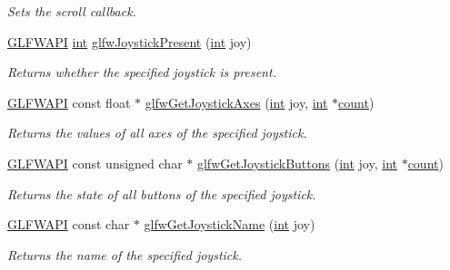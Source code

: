 \begin{DoxyCompactItemize}
\begin{DoxyCompactList}\small\item\em Sets the scroll callback. \end{DoxyCompactList}\item 
\hyperlink{glfw3_8h_a56da5036b2cc259351ae22fd6439bb47}{G\-L\-F\-W\-A\-P\-I} \hyperlink{wglew_8h_a500a82aecba06f4550f6849b8099ca21}{int} \hyperlink{group__input_ga7f81f22f355f4b7d315caf73cdfd9906}{glfw\-Joystick\-Present} (\hyperlink{wglew_8h_a500a82aecba06f4550f6849b8099ca21}{int} joy)
\begin{DoxyCompactList}\small\item\em Returns whether the specified joystick is present. \end{DoxyCompactList}\item 
\hyperlink{glfw3_8h_a56da5036b2cc259351ae22fd6439bb47}{G\-L\-F\-W\-A\-P\-I} const float $\ast$ \hyperlink{group__input_gaab9e573d808b088c5079c0f577d39448}{glfw\-Get\-Joystick\-Axes} (\hyperlink{wglew_8h_a500a82aecba06f4550f6849b8099ca21}{int} joy, \hyperlink{wglew_8h_a500a82aecba06f4550f6849b8099ca21}{int} $\ast$\hyperlink{glew_8h_a10b284d589000663becfbc6867a3a9f7}{count})
\begin{DoxyCompactList}\small\item\em Returns the values of all axes of the specified joystick. \end{DoxyCompactList}\item 
\hyperlink{glfw3_8h_a56da5036b2cc259351ae22fd6439bb47}{G\-L\-F\-W\-A\-P\-I} const unsigned char $\ast$ \hyperlink{group__input_ga3951bea72b5fb4870b1aa0e5c2e9c903}{glfw\-Get\-Joystick\-Buttons} (\hyperlink{wglew_8h_a500a82aecba06f4550f6849b8099ca21}{int} joy, \hyperlink{wglew_8h_a500a82aecba06f4550f6849b8099ca21}{int} $\ast$\hyperlink{glew_8h_a10b284d589000663becfbc6867a3a9f7}{count})
\begin{DoxyCompactList}\small\item\em Returns the state of all buttons of the specified joystick. \end{DoxyCompactList}\item 
\hyperlink{glfw3_8h_a56da5036b2cc259351ae22fd6439bb47}{G\-L\-F\-W\-A\-P\-I} const char $\ast$ \hyperlink{group__input_gac50a4fd9b01886cf9fa2c45f19191fb8}{glfw\-Get\-Joystick\-Name} (\hyperlink{wglew_8h_a500a82aecba06f4550f6849b8099ca21}{int} joy)
\begin{DoxyCompactList}\small\item\em Returns the name of the specified joystick. \end{DoxyCompactList}\end{DoxyCompactItemize}
